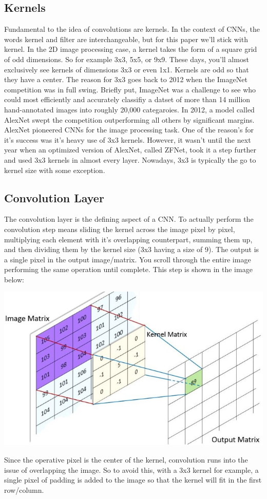 \documentclass{article}
\begin{document}
    \subsection{Kernels}
        Fundamental to the idea of convolutions are kernels. In the context of CNNs, the words kernel and filter are interchangeable, but for this paper we'll stick with kernel. In the 2D image processing case, a kernel takes the form of a square grid of odd dimensions. So for example 3x3, 5x5, or 9x9. These days, you'll almost exclusively see kernels of dimensions 3x3 or even 1x1. Kernels are odd so that they have a center. The reason for 3x3 goes back to 2012 when the ImageNet competition was in full swing. Briefly put, ImageNet was a challenge to see who could most efficiently and accurately classifiy a datset of more than 14 million hand-annotated images into roughly 20,000 categaroies. In 2012, a model called AlexNet swept the competition outperforming all others by significant margins. AlexNet pioneered CNNs for the image processing task. One of the reason's for it's success was it's heavy use of 3x3 kernels. However, it wasn't until the next year when an optimized version of AlexNet, called ZFNet, took it a step further and used 3x3 kernels in almost every layer. Nowadays, 3x3 is typically the go to kernel size with some exception.
    
    \subsection{Convolution Layer}
        The convolution layer is the defining aspect of a CNN. To actually perform the convolution step means sliding the kernel across the image pixel by pixel, multiplying each element with it's overlapping counterpart, summing them up, and then dividing them by the kernel size (3x3 having a size of 9). The output is a single pixel in the output image/matrix. You scroll through the entire image performing the same operation until complete. This step is shown in the image below:
        \begin{center}
            \includegraphics[scale=0.6]{images/kernel.jpg}
        \end{center}
        Since the operative pixel is the center of the kernel, convolution runs into the issue of overlapping the image. So to avoid this, with a 3x3 kernel for example, a single pixel of padding is added to the image so that the kernel will fit in the first row/column.
\end{document}
